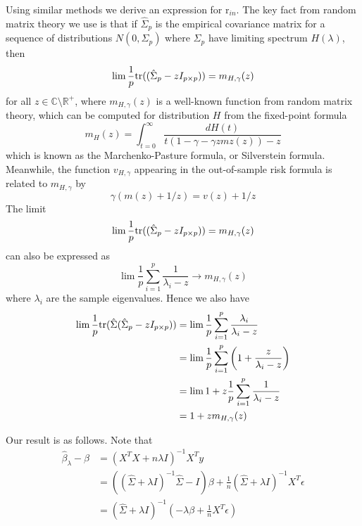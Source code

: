 \documentclass[11pt]{article}
\begin{document}
Using similar methods we derive an expression for $\text{r}_{in}$.
The key fact from random matrix theory we use is that if
$\hat{\Sigma}_p$ is the empirical covariance matrix for a sequence of
distributions $N(0, \Sigma_p)$ where $\Sigma_p$ have limiting spectrum
$H(\lambda)$, then
\[
\lim \frac{1}{p} \text{tr}((\hat{\Sigma}_p - zI_{p \times p})) = m_{H, \gamma}(z)
\]
for all $z \in \mathbb{C}\setminus \mathbb{R}^+$,
where $m_{H, \gamma}(z)$ is a well-known function from random matrix theory, which can be computed for distribution $H$ from the fixed-point formula
\[
m_H(z) = \int_{t=0}^\infty \frac{dH(t)}{t(1- \gamma - \gamma z mz(z)) - z}
\]
which is known as the Marchenko-Pasture formula, or Silverstein formula.
Meanwhile, the function $v_{H,\gamma}$ appearing in the out-of-sample risk formula is related to $m_{H,\gamma}$ by
\[
\gamma( m(z) + 1/z) = v(z) + 1/z
\]
The limit
\[
\lim \frac{1}{p} \text{tr}((\hat{\Sigma}_p - zI_{p \times p})) = m_{H, \gamma}(z)
\]
can also be expressed as
\[
\lim \frac{1}{p} \sum_{i=1}^p \frac{1}{\lambda_i - z} \to m_{H, \gamma}(z)
\]
where $\lambda_i$ are the sample eigenvalues.
Hence we also have
\begin{align*}
\lim \frac{1}{p} \text{tr}(\hat{\Sigma}(\hat{\Sigma}_p - zI_{p \times p}))
&= \lim \frac{1}{p} \sum_{i=1}^p \frac{\lambda_i}{\lambda_i - z}
\\&= \lim \frac{1}{p} \sum_{i=1}^p \left( 1 + \frac{z}{\lambda_i - z}\right)
\\&= \lim 1 + z\frac{1}{p} \sum_{i=1}^p \frac{1}{\lambda_i - z}
\\&= 1 + zm_{H,\gamma}(z)
\end{align*}



Our result is as follows.  
Note that
\begin{align*}
\hat{\beta}_\lambda - \beta &= (X^T X + n\lambda I)^{-1} X^T y 
\\&= ((\hat{\Sigma} + \lambda I)^{-1}\hat{\Sigma} - I)\beta + \frac{1}{n}(\hat{\Sigma} + \lambda I)^{-1} X^T \epsilon
\\&= (\hat{\Sigma} + \lambda I)^{-1} \left(-\lambda \beta + \frac{1}{n} X^T \epsilon\right)
\end{align*}
\end{document}
